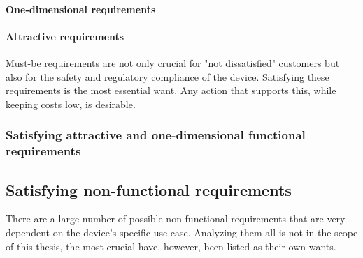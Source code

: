 \paragraph{One-dimensional requirements} \autocite{ElmarSauerwein.1996} 

\paragraph{Attractive requirements} \autocite{ElmarSauerwein.1996}

Must-be requirements are not only crucial for "not dissatisfied" customers but also for the safety and regulatory compliance of the device. Satisfying these requirements is the most essential want. Any action that supports this, while keeping costs low, is desirable.

\begin{comment}
In projects that consist purely of software, customer dissatisfaction is the only negative factor. Projects that also require custom hardware have an additional cost. The hardware already needs to implement every functionality and all manufactured devices need to support it. If the feature is then not implemented the hardware costs more without offering the benefits.
\end{comment}

\subsubsection{Satisfying attractive and one-dimensional functional requirements}

\subsection{Satisfying non-functional requirements}
There are a large number of possible non-functional requirements that are very dependent on the device's specific use-case. Analyzing them all is not in the scope of this thesis, the most crucial have, however, been listed as their own wants. 


